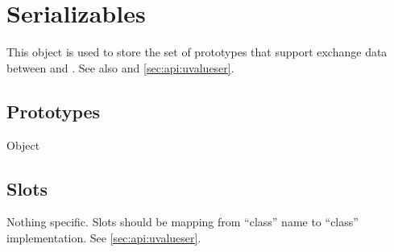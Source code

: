 
\section{Serializables}

This object is used to store the set of prototypes that support exchange
data between \Cxx and \us.  See also  and
\autoref{sec:api:uvalueser}.

\subsection{Prototypes}

\begin{refObjects}
\item[Object]
\end{refObjects}

\subsection{Slots}
Nothing specific.  Slots should be mapping from ``class'' name to ``class''
implementation.  See \autoref{sec:api:uvalueser}.

